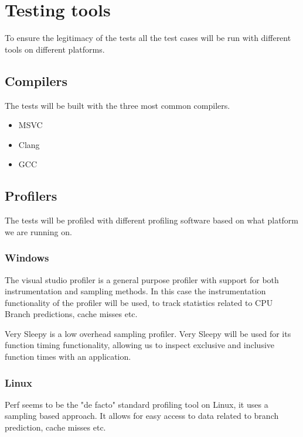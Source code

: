 \section{Testing tools}
To ensure the legitimacy of the tests all the test cases will be run with different tools on different platforms.

\subsection{Compilers}
The tests will be built with the three most common compilers. 
\begin{itemize}

    \item
    MSVC
    
    \item
    Clang

    \item
    GCC

\end{itemize}


\subsection{Profilers}
The tests will be profiled with different profiling software based on what platform we are running on.

\subsubsection{Windows}
The visual studio profiler is a general purpose profiler with support for both instrumentation and sampling methods.
In this case the instrumentation functionality of the profiler will be used, to track statistics related to CPU Branch predictions, cache misses etc.

Very Sleepy is a low overhead sampling profiler. 
Very Sleepy will be used for its function timing functionality, allowing us to inspect exclusive and inclusive function times with an application.

\subsubsection{Linux}
Perf seems to be the "de facto" standard profiling tool on Linux, it uses a sampling based approach.
It allows for easy access to data related to branch prediction, cache misses etc. 

